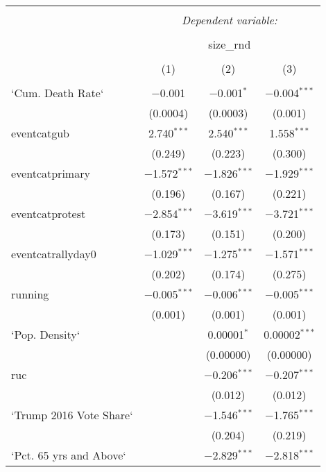 
\begin{table}[!htbp] \centering 
  \caption{} 
  \label{} 
\tiny 
\begin{tabular}{@{\extracolsep{5pt}}lccc} 
\\[-1.8ex]\hline 
\hline \\[-1.8ex] 
 & \multicolumn{3}{c}{\textit{Dependent variable:}} \\ 
\cline{2-4} 
\\[-1.8ex] & \multicolumn{3}{c}{size\_rnd} \\ 
\\[-1.8ex] & (1) & (2) & (3)\\ 
\hline \\[-1.8ex] 
 `Cum. Death Rate` & $-$0.001 & $-$0.001$^{*}$ & $-$0.004$^{***}$ \\ 
  & (0.0004) & (0.0003) & (0.001) \\ 
  eventcatgub & 2.740$^{***}$ & 2.540$^{***}$ & 1.558$^{***}$ \\ 
  & (0.249) & (0.223) & (0.300) \\ 
  eventcatprimary & $-$1.572$^{***}$ & $-$1.826$^{***}$ & $-$1.929$^{***}$ \\ 
  & (0.196) & (0.167) & (0.221) \\ 
  eventcatprotest & $-$2.854$^{***}$ & $-$3.619$^{***}$ & $-$3.721$^{***}$ \\ 
  & (0.173) & (0.151) & (0.200) \\ 
  eventcatrallyday0 & $-$1.029$^{***}$ & $-$1.275$^{***}$ & $-$1.571$^{***}$ \\ 
  & (0.202) & (0.174) & (0.275) \\ 
  running & $-$0.005$^{***}$ & $-$0.006$^{***}$ & $-$0.005$^{***}$ \\ 
  & (0.001) & (0.001) & (0.001) \\ 
  `Pop. Density` &  & 0.00001$^{*}$ & 0.00002$^{***}$ \\ 
  &  & (0.00000) & (0.00000) \\ 
  ruc &  & $-$0.206$^{***}$ & $-$0.207$^{***}$ \\ 
  &  & (0.012) & (0.012) \\ 
  `Trump 2016 Vote Share` &  & $-$1.546$^{***}$ & $-$1.765$^{***}$ \\ 
  &  & (0.204) & (0.219) \\ 
  `Pct. 65 yrs and Above` &  & $-$2.829$^{***}$ & $-$2.818$^{***}$ \\ 

\end{tabular}
\end{table}
